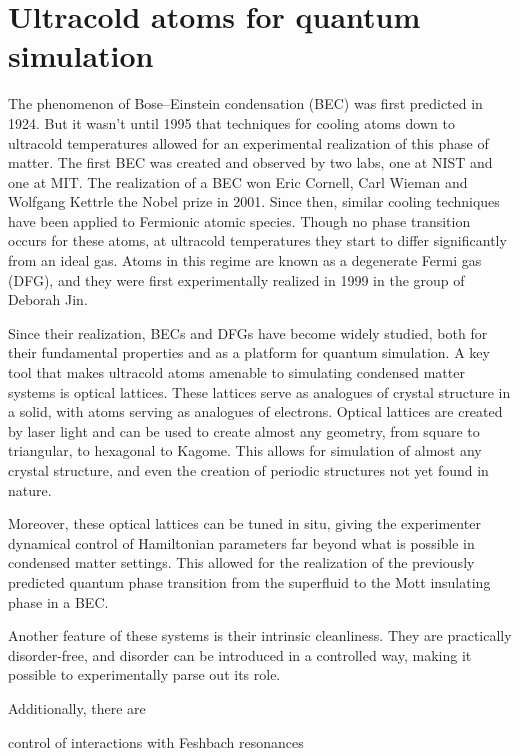 \section{Ultracold atoms for quantum simulation}
The phenomenon of Bose--Einstein condensation (BEC) was first predicted in 1924\cite{Bose1924}. But it wasn't until 1995 that techniques for cooling atoms down to ultracold temperatures allowed for an experimental realization of this phase of matter. The first BEC was created and observed by two labs, one at NIST\cite{Anderson1995} and one at MIT\cite{Davis1995}. The realization of a BEC won Eric Cornell, Carl Wieman and Wolfgang Kettrle the Nobel prize in 2001. Since then, similar cooling techniques have been applied to Fermionic atomic species. Though no phase transition occurs for these atoms, at ultracold temperatures they start to differ significantly from an ideal gas. Atoms in this regime are known as a degenerate Fermi gas (DFG), and they were first experimentally realized in 1999 in the group of Deborah Jin. 

Since their realization, BECs and DFGs have become widely studied, both for their fundamental properties and as a platform for quantum simulation. A key tool that makes ultracold atoms amenable to simulating condensed matter systems is optical lattices. These lattices serve as analogues of crystal structure in a solid, with atoms serving as analogues of electrons. Optical lattices are created by laser light and can be used to create almost any geometry, from square\cite{Greiner2001} to triangular\cite{Becker2010,Struck2011}, to hexagonal\cite{Tarruell2012} to Kagome\cite{Liu2010}. This allows for simulation of almost any crystal structure, and even the creation of periodic structures not yet found in nature. 

Moreover, these optical lattices can be tuned in situ, giving the experimenter dynamical control of Hamiltonian parameters far beyond what is possible in condensed matter settings. This allowed for the realization of the previously predicted \cite{Fisher1989} quantum phase transition from the superfluid to the Mott insulating phase in a BEC\cite{Greiner2002,Mun2008}.

Another feature of these systems is their intrinsic cleanliness. They are practically disorder-free, and disorder can be introduced in a controlled way, making it possible to experimentally parse out its role. 

Additionally, there are 

	control of interactions with Feshbach resonances

